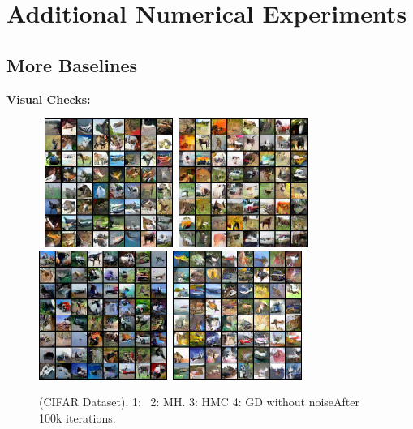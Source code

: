 \documentclass[letterpaper]{article} %
\begin{document}
\clearpage
\section{Additional Numerical Experiments}

\subsection{More Baselines}


\textbf{Visual Checks:}


\begin{figure}[H]
\begin{center}
    \mbox{
        \includegraphics[width=1.65in]{figs/cifaranila}
        \includegraphics[width=1.65in]{figs/mh_x_q_099900}
        }\vspace{0.05in}
            \mbox{
                \includegraphics[width=1.65in]{figs/hmc_x_q_099900}
                        \includegraphics[width=1.65in]{figs/gd_x_q_099900}
        }
\end{center}
\caption{(CIFAR Dataset). 1: \algo\ 2: MH. 3: HMC 4: GD without noiseAfter 100k iterations.}
	\label{fig:cifar}
\end{figure}
\end{document}
